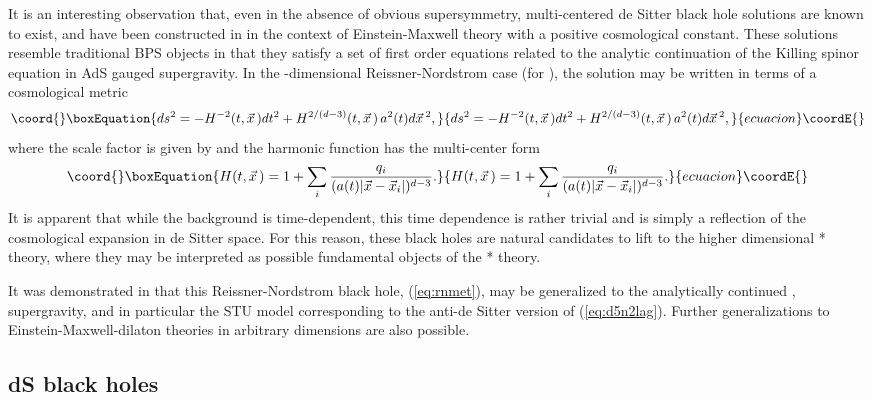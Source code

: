 \documentclass[a4paper,12pt]{article}
\providecommand{\fft}[2]{{\frac{#1}{#2}}}
\begin{document}
It is an interesting observation that, even in the absence of obvious
supersymmetry, multi-centered de Sitter black hole solutions are known to
exist, and have been constructed in \cite{Kastor:1992nn,London} in the
context of Einstein-Maxwell theory with a positive cosmological constant.
These solutions resemble traditional BPS objects in that they satisfy a
set of first order equations \cite{London,Liu,Behrndt} related to the
analytic continuation of the Killing spinor equation in AdS gauged
supergravity.  In the \coordHE{}-dimensional Reissner-Nordstrom case (for \coordHE{}),
the solution may be written in terms of a cosmological metric
%
\begin{equation}\coord{}\boxEquation{
ds^2=-H^{-2}(t,\vec x\,)dt^2+H^{2/(d-3)}(t,\vec x\,)\,a^2(t)d\vec x\,^2,
\label{eq:rnmet}
}{
ds^2=-H^{-2}(t,\vec x\,)dt^2+H^{2/(d-3)}(t,\vec x\,)\,a^2(t)d\vec x\,^2,
}{ecuacion}\coordE{}\end{equation}
%
where the scale factor is given by \coordHE{} and the harmonic
function has the multi-center form
%
\begin{equation}\coord{}\boxEquation{
H(t,\vec x\,)=1+\sum_i\fft{q_i}{(a(t)|\vec x-\vec x_i|)^{d-3}}.
}{
H(t,\vec x\,)=1+\sum_i\fft{q_i}{(a(t)|\vec x-\vec x_i|)^{d-3}}.
}{ecuacion}\coordE{}\end{equation}
%
It is apparent that while the background is time-dependent, this time
dependence is rather trivial and is simply a reflection of the cosmological
expansion in de Sitter space.  For this reason, these black holes are
natural candidates to lift to the higher dimensional * theory, where they
may be interpreted as possible fundamental objects of the * theory.

It was demonstrated in \cite{Liu} that this Reissner-Nordstrom black hole,
(\ref{eq:rnmet}), may be generalized to the analytically continued \coordHE{},
\coordHE{} supergravity, and in particular the STU model corresponding to the
anti-de Sitter version of (\ref{eq:d5n2lag}).  Further generalizations 
to Einstein-Maxwell-dilaton theories in arbitrary dimensions are also
possible.

\subsection{\coordHE{} dS black holes}
\end{document}

